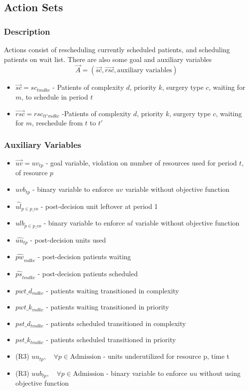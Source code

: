 \subsection{Action Sets}
\subsubsection{Description}
Actions consist of rescheduling currently scheduled patients, and scheduling patients on wait list. There are also some goal and auxiliary variables
\[  \vec{A} = (\vec{sc}, \vec{rsc}, \text{auxiliary variables}) \] 
\begin{itemize}
	\item $\vec{sc} = sc_{tmdkc}$ - Patients of complexity $d$, priority $k$,  surgery type $c$, waiting for $m$, to schedule in period $t$
	\item $\vec{rsc} = rsc_{tt'mdkc}$ -Patients of complexity $d$, priority $k$, surgery type $c$, waiting for $m$, reschedule from $t$ to $t'$
\end{itemize}

\subsubsection{Auxiliary Variables}
\begin{itemize}
	\item $\vec{uv} = uv_{tp}$ - goal variable, violation on number of resources used for period $t$, of resource $p$
	\item $uvb_{tp}$ - binary variable to enforce $uv$ variable without objective function
	\item $\hat{ul}_{p \in p\_co}$ - post-decision unit leftover at period 1
	\item $ulb_{p \in p\_co}$ - binary variable to enforce $ul$ variable without objective function
	\item $\hat{uu}_{tp}$ - post-decision units used
	\item $\hat{pw}_{mdkc}$ - post-decision patients waiting
	\item $\hat{ps}_{tmdkc}$ - post-decision patients scheduled
	\item $pwt\_d_{mdkc}$ - patients waiting transitioned in complexity
	\item $pwt\_k_{mdkc}$ - patients waiting transitioned in priority
	\item $pst\_d_{tmdkc}$ - patients scheduled transitioned in complexity
	\item $pst\_k_{tmdkc}$ - patients scheduled transitioned in priority
	\item (R3) $uu_{tp}, \quad \forall p \in {\text{Admission}}$ - units underutilized for resource p, time t
	\item (R3) $uub_{tp}, \quad \forall p \in {\text{Admission}}$ - binary variable to enforce $uu$ without using objective function
\end{itemize}
